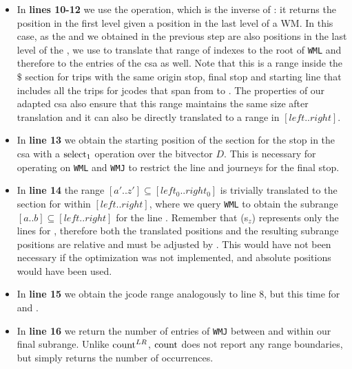 \begin{itemize}
        \item In \textbf{lines 10-12} we use the  operation, which is the inverse of : it returns the position in the first level given a position in the last level of a WM. In this case, as the  and  we obtained in the previous step are also positions in the last level of the , we use  to translate that range of indexes to the root of \texttt{WML} and therefore to the entries of the \gls{csa} as well. Note that this is a range inside the $\$$ section for trips with the same origin stop, final stop and starting line that includes all the trips for jcodes that span from  to . The properties of our adapted \gls{csa} also ensure that this range maintains the same size after translation and it can also be directly translated to a range in $[left..right]$.
        
        \item In \textbf{line 13} we obtain the starting position of the section for the stop  in the \gls{csa} with a $\operatorname{select}_1$ operation over the bitvector $D$. This is necessary for operating on \texttt{WML} and \texttt{WMJ} to restrict the line and journeys for the final stop.
        
        \item In \textbf{line 14} the range $[a'..z'] \subseteq [left_0..right_0]$ is trivially translated to the section for  within $[left..right]$, where we query \texttt{WML} to obtain the subrange $[a..b] \subseteq [left..right]$ for the line . Remember that (s$_z$) represents only the lines for , therefore both the translated positions and the resulting subrange positions are relative and must be adjusted by . This would have not been necessary if the optimization was not implemented, and absolute positions would have been used.
        
        \item In \textbf{line 15} we obtain the jcode range analogously to line 8, but this time for  and .
        
        \item In \textbf{line 16} we return the number of entries of \texttt{WMJ} between  and  within our final subrange. Unlike $\operatorname{count}^{LR}$, $\operatorname{count}$ does not report any range boundaries, but simply returns the number of occurrences.
    \end{itemize}
    
